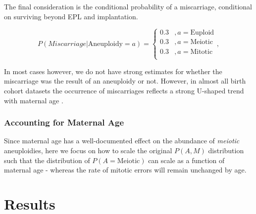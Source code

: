 \documentclass{article}
\begin{document}
The final consideration is the conditional probability of a miscarriage, conditional on surviving beyond EPL and implantation. 

\begin{equation}
	P(Miscarriage | \text{Aneuploidy}=a) = \begin{cases}
	0.3 &, a= \text{Euploid}\\
	0.3 &, a = \text{Meiotic}\\
	0.3 &, a = \text{Mitotic}\\
	\end{cases},
\end{equation}

In most cases however, we do not have strong estimates for whether the miscarriage was the result of an aneuploidy or not. However, in almost all birth cohort datasets the occurrence of miscarriages reflects a strong U-shaped trend  with maternal age \citep{Gruhn2019-al}. 


\subsubsection*{Accounting for Maternal Age} 

Since maternal age has a well-documented effect on the abundance of \textit{meiotic} aneuploidies, here we focus on how to scale the original $P(A,M)$ distribution such that the distribution of $P(A = \text{Meiotic})$ can scale as a function of maternal age - whereas the rate of mitotic errors will remain unchanged by age. 



\section*{Results}






\end{document}
